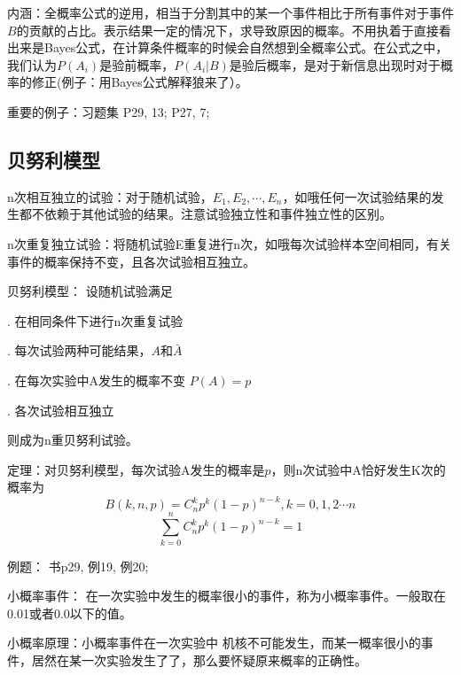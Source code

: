 \documentclass[10pt, a4paper]{article}
\begin{document}
            内涵：全概率公式的逆用，相当于分割其中的某一个事件相比于所有事件对于事件$B$的贡献的占比。表示结果一定的情况下，求导致原因的概率。不用执着于直接看出来是Bayes公式，在计算条件概率的时候会自然想到全概率公式。在公式之中，我们认为$P(A_i)$是验前概率，$P(A_i|B)$是验后概率，是对于新信息出现时对于概率的修正(例子：用Bayes公式解释狼来了）。

            重要的例子：习题集 P29, 13; P27, 7;
        \subsection{贝努利模型}
            n次相互独立的试验：对于随机试验，$E_1, E_2, \cdots, E_n$，如哦任何一次试验结果的发生都不依赖于其他试验的结果。注意试验独立性和事件独立性的区别。

            n次重复独立试验：将随机试验E重复进行n次，如哦每次试验样本空间相同，有关事件的概率保持不变，且各次试验相互独立。

            贝努利模型： 设随机试验满足

                . 在相同条件下进行n次重复试验

                . 每次试验两种可能结果，$A$和$\bar{A}$

                . 在每次实验中A发生的概率不变 $P(A) = p$

                . 各次试验相互独立
            
                则成为n重贝努利试验。

            定理：对贝努利模型，每次试验A发生的概率是$p$，则n次试验中A恰好发生K次的概率为
            $$B(k, n, p) = C_n^kp^k(1 - p)^{n - k}, k = 0, 1, 2 \cdots n$$
            $$\sum_{k = 0}^{n}C_n^kp^k(1 - p)^{n - k} = 1$$
            
            例题： 书p29, 例19, 例20;

            小概率事件： 在一次实验中发生的概率很小的事件，称为小概率事件。一般取在0.01或者0.0以下的值。 

            小概率原理：小概率事件在一次实验中 机核不可能发生，而某一概率很小的事件，居然在某一次实验发生了了，那么要怀疑原来概率的正确性。 
\end{document}
